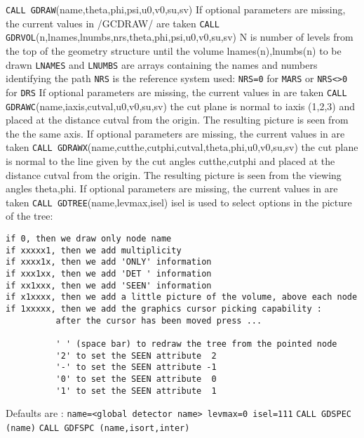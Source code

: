     
            
             
{\tt CALL GDRAW}(name,theta,phi,psi,u0,v0,su,sv)
If optional parameters are missing, the current values in /GCDRAW/
are taken
{\tt CALL GDRVOL}(n,lnames,lnumbs,nrs,theta,phi,psi,u0,v0,su,sv)
N is number of levels from the top of the geometry structure
until the volume lnames(n),lnumbs(n) to be drawn
{\tt LNAMES} and {\tt LNUMBS} are arrays containing the names and numbers
identifying the path
{\tt NRS} is the reference system used: {\tt NRS=0} for {\tt MARS} or
{\tt NRS<>0} for {\tt DRS}
If optional parameters are missing, the current values in
are taken
{\tt CALL GDRAWC}(name,iaxis,cutval,u0,v0,su,sv)
the cut plane is normal to iaxis (1,2,3)
and placed at the distance cutval from the origin.
The resulting picture is seen from the the same axis.
If optional parameters are missing, the current values in 
are taken
{\tt CALL GDRAWX}(name,cutthe,cutphi,cutval,theta,phi,u0,v0,su,sv)
the cut plane is normal to the line given by the
cut angles cutthe,cutphi and placed at the distance cutval from the
origin.
The resulting picture is seen from the viewing angles theta,phi.
If optional parameters are missing, the current values in 
are taken
{\tt CALL GDTREE}(name,levmax,isel)
isel is used to select options in the picture of the tree:
\begin{verbatim}
if 0, then we draw only node name
if xxxxx1, then we add multiplicity
if xxxx1x, then we add 'ONLY' information
if xxx1xx, then we add 'DET ' information
if xx1xxx, then we add 'SEEN' information
if x1xxxx, then we add a little picture of the volume, above each node
if 1xxxxx, then we add the graphics cursor picking capability :
          after the cursor has been moved press ...
 
          ' ' (space bar) to redraw the tree from the pointed node
          '2' to set the SEEN attribute  2
          '-' to set the SEEN attribute -1
          '0' to set the SEEN attribute  0
          '1' to set the SEEN attribute  1
\end{verbatim}
Defaults are : {\tt name=<global detector name> levmax=0 isel=111}
{\tt CALL GDSPEC (name)}
{\tt CALL GDFSPC (name,isort,inter)}
 
